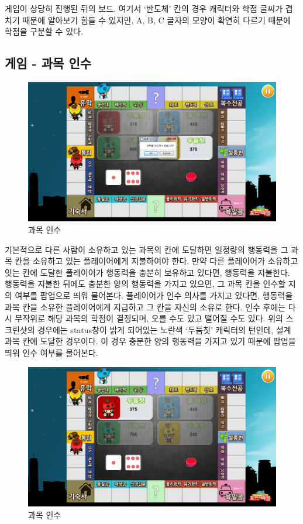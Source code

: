 \documentclass[10pt,oneside,a4paper,titlepage]{article}
\begin{document}
게임이 상당히 진행된 뒤의 보드. 여기서 ‘반도체’ 칸의 경우 캐릭터와 학점 글씨가 겹치기 때문에 알아보기 힘들 수 있지만, A, B, C 글자의 모양이 확연히 다르기 때문에 학점을 구분할 수 있다.
 
 
\subsection{게임 - 과목 인수}
\begin{figure}[H]
\centering
\centerline{\includegraphics[scale=0.65]{images/5takeover}}
\caption{과목 인수}
\end{figure}

기본적으로 다른 사람이 소유하고 있는 과목의 칸에 도달하면 일정량의 행동력을 그 과목 칸을 소유하고 있는 플레이어에게 지불하여야 한다. 만약 다른 플레이어가 소유하고 잇는 칸에 도달한 플레이어가 행동력을 충분히 보유하고 있다면, 행동력을 지불한다. 행동력을 지불한 뒤에도 충분한 양의 행동력을 가지고 있으면, 그 과목 칸을 인수할 지의 여부를 팝업으로 띄워 물어본다. 플레이어가 인수 의사를 가지고 있다면, 행동력을 과목 칸을 소유한 플레이어에게 지급하고 그 칸을 자신의 소유로 한다. 인수 후에는 다시 무작위로 해당 과목의 학점이 결정되며, 오를 수도 있고 떨어질 수도 있다. 위의 스크린샷의 경우에는 status창이 밝게 되어있는 노란색 ‘두둠칫’ 캐릭터의 턴인데, 설계 과목 칸에 도달한 경우이다. 이 경우 충분한 양의 행동력을 가지고 있기 때문에 팝업을 띄워 인수 여부를 물어본다.	
 
\begin{figure}[H]
\centering
\centerline{\includegraphics[scale=0.65]{images/5takeover2}}
\caption{과목 인수}
\end{figure}
 
\end{document}
